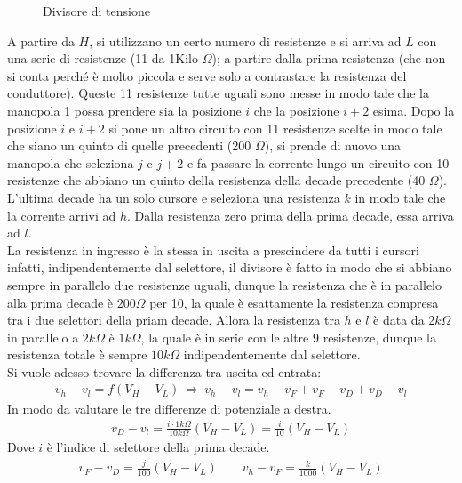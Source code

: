 \documentclass[a4paper, oneside]{article}
\begin{document}
\begin{figure}
    \centering
    \caption{Divisore di tensione}
    \begin{circuitikz}
        
    \end{circuitikz}    
\end{figure} \noindent
A partire da $H$, si utilizzano un certo numero di resistenze e si arriva ad $L$ 
con una serie di resistenze (11 da 1Kilo $\Omega$); a partire dalla prima resistenza (che non si conta perché 
è molto piccola e serve solo a contrastare la resistenza del conduttore). Queste 11 resistenze tutte 
uguali sono messe in modo tale che la manopola 1 possa prendere sia la posizione $i$ che la posizione $i + 2$ esima.
Dopo la posizione $i$ e $i + 2$ si pone un altro circuito con 11 resistenze
scelte in modo tale che siano un quinto di quelle precedenti (200 $\Omega$), si prende di nuovo una manopola
che seleziona $j$ e $j + 2$ e fa passare la corrente lungo un circuito con 10 resistenze
che abbiano un quinto della resistenza della decade precedente (40 $\Omega$). L'ultima decade 
ha un solo cursore e seleziona una resistenza $k$ in modo tale che la corrente arrivi ad $h$. Dalla resistenza
zero prima della prima decade, essa arriva ad $l$. \\
La resistenza in ingresso è la stessa in uscita a prescindere da tutti i cursori infatti,
indipendentemente dal selettore, il divisore è fatto in modo che si abbiano sempre
in parallelo due resistenze uguali, dunque la resistenza che è in parallelo alla 
prima decade è $200\Omega$ per 10, la quale è esattamente la resistenza 
compresa tra i due selettori della priam decade. Allora la resistenza
tra $h$ e $l$ è data da 2$k\Omega$ in parallelo a $2k\Omega$ è $1k\Omega$, 
la quale è in serie con le altre 9 resistenze, dunque la resistenza totale è sempre $10 k\Omega$
indipendentemente dal selettore.  \\
Si vuole adesso trovare la differenza tra uscita ed entrata:
\begin{gather*}
    v_h - v_l = f(V_H - V_L) \ \Longrightarrow \ v_h - v_l = v_h - v_F + v_F - v_D + v_D - v_l
\end{gather*}
In modo da valutare le tre differenze di potenziale a destra. 
\begin{gather*}
    v_D - v_l = \frac{i \cdot 1k\Omega}{10 k\Omega} (V_H - V_L) = \frac{i}{10} (V_H - V_L)
\end{gather*}
Dove $i$ è l'indice di selettore della prima decade. 
\begin{gather*}
    v_F - v_D = \frac{j}{100}(V_H - V_L) \qquad v_h - v_F = \frac{k}{1000} (V_H - V_L)
\end{gather*}
\end{document}
